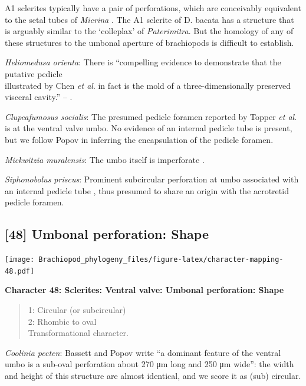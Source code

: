 \documentclass[openany]{book}
\theoremstyle{definition}
\theoremstyle{definition}
\theoremstyle{definition}
\theoremstyle{remark}
\begin{document}
A1 sclerites typically have a pair of perforations, which are
conceivably equivalent to the setal tubes of \emph{Micrina}
\citep{Holmer2011Firstrecord}. The A1 sclerite of D. bacata has a
structure that is arguably similar to the `colleplax' of
\emph{Paterimitra}. But the homology of any of these structures to the
umbonal aperture of brachiopods is difficult to establish.

\emph{Heliomedusa orienta}: There is ``compelling evidence to
demonstrate that the putative pedicle\\
illustrated by Chen \emph{et al}. \citeyearpar[Figs. 4, 6,
7]{Chen2007Reinterpretationof} in fact is the mold of a
three-dimensionally preserved visceral cavity.'' --
\citet{Zhang2009Architectureand}.

\emph{Clupeafumosus socialis}: The presumed pedicle foramen reported by
Topper \emph{et al}. \citeyearpar{Topper2013Reappraisalof} is at the
ventral valve umbo. No evidence of an internal pedicle tube is present,
but we follow Popov \citeyearpar{Popov1992TheCambrian} in inferring the
encapsulation of the pedicle foramen.

\emph{Mickwitzia muralensis}: The umbo itself is imperforate
\citep{Balthasar2004Shellstructure}.

\emph{Siphonobolus priscus}: Prominent subcircular perforation at umbo
associated with an internal pedicle tube \citep{Popov2009Earlyontogeny},
thus presumed to share an origin with the acrotretid pedicle foramen.

\hypertarget{umbonal-perforation-shape}{%
\subsection*{{[}48{]} Umbonal perforation:
Shape}\label{umbonal-perforation-shape}}

\texttt{[image: Brachiopod\_phylogeny\_files/figure-latex/character-mapping-48.pdf]}

\textbf{Character 48: Sclerites: Ventral valve: Umbonal perforation:
Shape}

\begin{quote}
1: Circular (or subcircular)\\
2: Rhombic to oval\\
Transformational character.
\end{quote}

\emph{Coolinia pecten}: Bassett and Popov write ``a dominant feature of
the ventral umbo is a sub-oval perforation about 270 μm long and 250 μm
wide'': the width and height of this structure are almost identical, and
we score it as (sub) circular.
\end{document}
